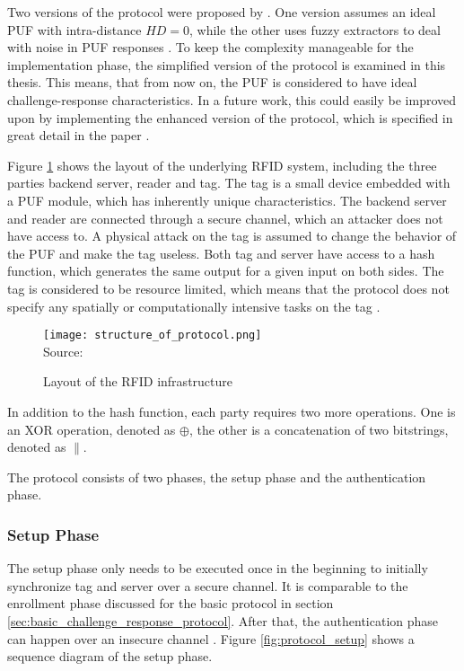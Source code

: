 Two versions of the protocol were proposed by \citeauthor*{Zhu2019}. One version assumes an ideal PUF with
intra-distance $HD = 0$, while the other uses fuzzy extractors to deal with
noise in PUF responses \cite[][p. 6, 8]{Zhu2019}.
To keep the complexity manageable for the implementation phase, the simplified version of the protocol
is examined in this thesis. This means, that from now on, the PUF is considered to have ideal challenge-response
characteristics.
In a future work, this could easily be improved upon by implementing the enhanced version of the protocol,
which is specified in great detail in the paper \cite[][p. 8]{Zhu2019}.

Figure \ref{fig:protocol_structure} shows the layout of the underlying RFID system, including the three parties
backend server, reader and tag. The tag is a small device embedded with a PUF module, which has inherently unique
characteristics. The backend server and reader are connected through a secure channel, which an attacker
does not have access to. A physical attack on the tag is assumed to change the behavior of the PUF and make
the tag useless. Both tag and server have access to a hash function, which generates the same output for a given
input on both sides. The tag is considered to be resource limited, which means that the protocol does not specify any
spatially or computationally intensive tasks on the tag \cite[][p. 5]{Zhu2019}.

\begin{figure}[H]
    \centering
    \caption{Layout of the RFID infrastructure}
    \label{fig:protocol_structure}
    \texttt{[image: structure\_of\_protocol.png]}
    \\
    Source: \cite[][p. 5]{Zhu2019}
\end{figure}

In addition to the hash function, each party requires two more operations.
One is an XOR operation, denoted as $\oplus$, the other is a concatenation of two bitstrings, denoted as $\parallel$.

The protocol consists of two phases, the setup phase and the authentication phase. \cite[][p. 6-8]{Zhu2019}

\subsubsection{Setup Phase}

The setup phase only needs to be executed once in the beginning to initially synchronize tag and server over a
secure channel. It is comparable to the enrollment phase discussed for the basic protocol in section \ref{sec:basic_challenge_response_protocol}.
After that, the authentication phase can happen over an insecure channel \cite[][p. 7]{Zhu2019}.
Figure \ref{fig:protocol_setup} shows a sequence diagram of the setup phase.

